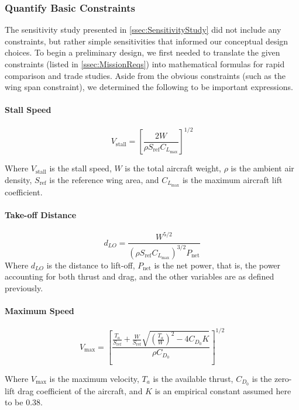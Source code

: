 \documentclass[report]{byu-aero}
\begin{document}
\subsubsection{Quantify Basic Constraints}
\label{sssec:constraints}

The sensitivity study presented in \cref{ssec:SensitivityStudy} did not include any constraints, but rather simple sensitivities that informed our conceptual design choices.  To begin a preliminary design, we first needed to translate the given constraints (listed in \cref{ssec:MissionReqs}) into mathematical formulas for rapid comparison and trade studies. Aside from the obvious constraints (such as the wing span constraint), we determined the following to be important expressions.

\paragraph{Stall Speed}

\[V_\text{stall} = \left[ \frac{2W}{\rho S_\text{ref} C_{L_\text{max}}} \right]^{1/2}\]

Where \(V_\text{stall}\) is the stall speed, \(W\) is the total aircraft weight, \(\rho\) is the ambient air density, \(S_\text{ref}\) is the reference wing area, and \(C_{L_\text{max}}\) is the maximum aircraft lift coefficient.

\paragraph{Take-off Distance}

\[ d_{LO} = \frac{ W^{5/2} }{ \left( \rho S_\text{ref} C_{L_\text{max}} \right)^{3/2} P_\text{net} } \]
Where \(d_{LO}\) is the distance to lift-off, \(P_\text{net}\) is the net power, that is, the power accounting for both thrust and drag, and the other variables are as defined previously.

\paragraph{Maximum Speed}

\[ V_\text{max} = \left[ \frac{ \frac{T_a}{S_\text{ref}} + \frac{W}{S_\text{ref}}\sqrt{\left(\frac{T_a}{W}\right)^2 - 4C_{D_0}K } }{\rho C_{D_0}} \right]^{1/2} \]

Where \(V_\text{max}\) is the maximum velocity, \(T_a\) is the available thrust, \(C_{D_0}\) is the zero-lift drag coefficient of the aircraft, and \(K\) is an empirical constant assumed here to be 0.38.
\end{document}

